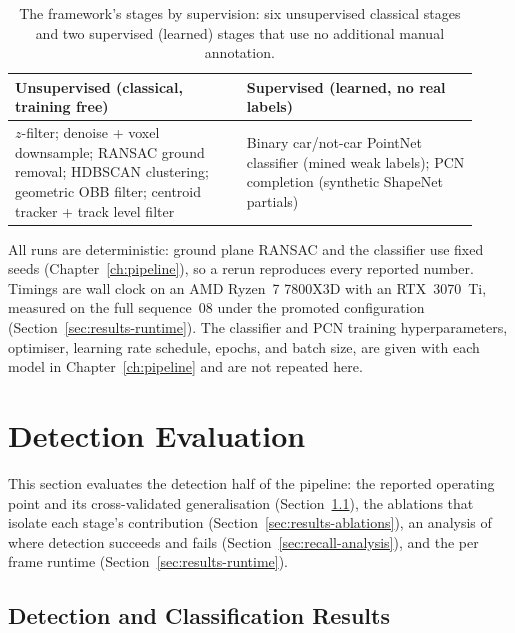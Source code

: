 \documentclass[a4paper,12pt]{report}
\begin{document}
\begin{table}[H]
  \centering
  \caption[Unsupervised and supervised stages of the framework]{The framework's stages by
    supervision: six unsupervised classical stages and two supervised (learned) stages that
    use no additional manual annotation.}
  \label{tab:sup-unsup}
  \small
  \begin{tabular}{@{}p{0.46\linewidth}p{0.46\linewidth}@{}}
    \toprule
    Unsupervised (classical, training free) & Supervised (learned, no real labels) \\
    \midrule
    $z$-filter; denoise + voxel downsample; RANSAC ground removal; HDBSCAN clustering;
      geometric OBB filter; centroid tracker + track level filter
      & Binary car/not-car PointNet classifier (mined weak labels); PCN completion
      (synthetic ShapeNet partials) \\
    \bottomrule
  \end{tabular}
\end{table}

\label{sec:eval-environment}
All runs are deterministic: ground plane RANSAC and the classifier use fixed
seeds (Chapter~\ref{ch:pipeline}), so a rerun reproduces every reported number.
Timings are wall clock on an AMD Ryzen~7 7800X3D with an RTX~3070~Ti, measured on
the full sequence~08 under the promoted configuration
(Section~\ref{sec:results-runtime}). The classifier and PCN training
hyperparameters, optimiser, learning rate schedule, epochs, and batch size,
are given with each model in Chapter~\ref{ch:pipeline} and are not repeated here.

\section{Detection Evaluation}
\label{sec:detection-evaluation}

This section evaluates the detection half of the pipeline: the reported
operating point and its cross-validated generalisation
(Section~\ref{sec:results-detection}), the ablations that isolate each
stage's contribution (Section~\ref{sec:results-ablations}), an analysis of
where detection succeeds and fails (Section~\ref{sec:recall-analysis}), and
the per frame runtime (Section~\ref{sec:results-runtime}).

\subsection{Detection and Classification Results}
\label{sec:results-detection}
\end{document}
